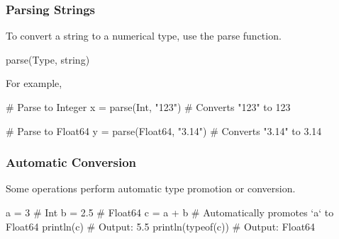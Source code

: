 \documentclass{report}
\begin{document}
    \bigbreak \noindent 
    \subsubsection{Parsing Strings}
    \bigbreak \noindent 
    To convert a string to a numerical type, use the parse function.
    \bigbreak \noindent 
    \begin{jlcode}
    parse(Type, string)
    \end{jlcode}
    \bigbreak \noindent 
    For example,
    \bigbreak \noindent 
    \begin{jlcode}
        # Parse to Integer
        x = parse(Int, "123")        # Converts "123" to 123

        # Parse to Float64
        y = parse(Float64, "3.14")   # Converts "3.14" to 3.14
    \end{jlcode}
    \bigbreak \noindent 
    \subsubsection{Automatic Conversion}
    \bigbreak \noindent 
    Some operations perform automatic type promotion or conversion.
    \bigbreak \noindent 
    \begin{jlcode}
        a = 3          # Int
        b = 2.5        # Float64
        c = a + b      # Automatically promotes `a` to Float64
        println(c)     # Output: 5.5
        println(typeof(c))  # Output: Float64
    \end{jlcode}

    \bigbreak \noindent 
\end{document}
